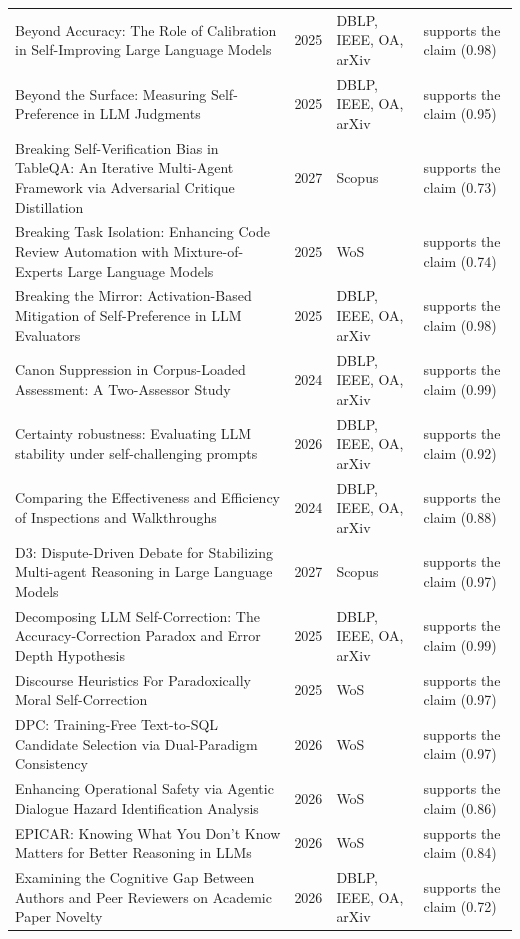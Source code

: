\begin{longtable}{@{}%
  >{\raggedright\arraybackslash}p{}c%
  >{\raggedright\arraybackslash}p{}%
  >{\raggedright\arraybackslash}p{}@{}}
Beyond Accuracy: The Role of Calibration in Self-Improving Large Language Models & 2025 & DBLP, IEEE, OA, arXiv & supports the claim (0.98) \\
Beyond the Surface: Measuring Self-Preference in LLM Judgments & 2025 & DBLP, IEEE, OA, arXiv & supports the claim (0.95) \\
Breaking Self-Verification Bias in TableQA: An Iterative Multi-Agent Framework via Adversarial Critique Distillation & 2027 & Scopus & supports the claim (0.73) \\
Breaking Task Isolation: Enhancing Code Review Automation with Mixture-of-Experts Large Language Models & 2025 & WoS & supports the claim (0.74) \\
Breaking the Mirror: Activation-Based Mitigation of Self-Preference in LLM Evaluators & 2025 & DBLP, IEEE, OA, arXiv & supports the claim (0.98) \\
Canon Suppression in Corpus-Loaded Assessment: A Two-Assessor Study & 2024 & DBLP, IEEE, OA, arXiv & supports the claim (0.99) \\
Certainty robustness: Evaluating LLM stability under self-challenging prompts & 2026 & DBLP, IEEE, OA, arXiv & supports the claim (0.92) \\
Comparing the Effectiveness and Efficiency of Inspections and Walkthroughs & 2024 & DBLP, IEEE, OA, arXiv & supports the claim (0.88) \\
D3: Dispute-Driven Debate for Stabilizing Multi-agent Reasoning in Large Language Models & 2027 & Scopus & supports the claim (0.97) \\
Decomposing LLM Self-Correction: The Accuracy-Correction Paradox and Error Depth Hypothesis & 2025 & DBLP, IEEE, OA, arXiv & supports the claim (0.99) \\
Discourse Heuristics For Paradoxically Moral Self-Correction & 2025 & WoS & supports the claim (0.97) \\
DPC: Training-Free Text-to-SQL Candidate Selection via Dual-Paradigm Consistency & 2026 & WoS & supports the claim (0.97) \\
Enhancing Operational Safety via Agentic Dialogue Hazard Identification Analysis & 2026 & WoS & supports the claim (0.86) \\
EPICAR: Knowing What You Don't Know Matters for Better Reasoning in LLMs & 2026 & WoS & supports the claim (0.84) \\
Examining the Cognitive Gap Between Authors and Peer Reviewers on Academic Paper Novelty & 2026 & DBLP, IEEE, OA, arXiv & supports the claim (0.72) \\

\end{longtable}
